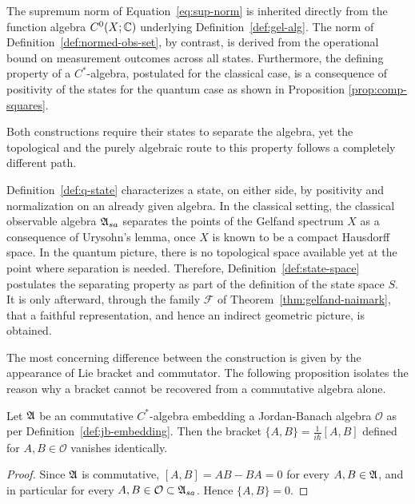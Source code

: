 	\begin{remark}
		\label{rem:concl-norm-comparison}
		The supremum norm of Equation~\eqref{eq:sup-norm} is inherited directly from the function algebra $C^0(X;\mathbb{C})$ underlying Definition~\ref{def:gel-alg}. The norm of Definition~\ref{def:normed-obs-set}, by contrast, is derived from the operational bound on measurement outcomes across all states. Furthermore, the defining property of a $C^*$-algebra, postulated for the classical case, is a consequence of positivity of the states for the quantum case as shown in Proposition \ref{prop:comp-squares}.
	\end{remark}
	
	\noindent Both constructions require their states to separate the algebra, yet the topological and the purely algebraic route to this property follows a completely different path.
	
	\begin{remark}
		\label{rem:concl-states-comparison}
		Definition~\ref{def:q-state} characterizes a state, on either side, by positivity and normalization on an already given algebra. In the classical setting, the classical observable algebra $\mathfrak{A}_{sa}$ separates the points of the Gelfand spectrum $X$ as a consequence of Urysohn's lemma, once $X$ is known to be a compact Hausdorff space. In the quantum picture, there is no topological space available yet at the point where separation is needed. Therefore, Definition~\ref{def:state-space} postulates the separating property as part of the definition of the state space $S$. It is only afterward, through the family $\mathcal F$ of Theorem~\ref{thm:gelfand-naimark}, that a faithful representation, and hence an indirect geometric picture, is obtained.
	\end{remark}
	
	\noindent The most concerning difference between the construction is given by the appearance of Lie bracket and commutator. The following proposition isolates the reason why a bracket cannot be recovered from a commutative algebra alone.
	
	\begin{proposition}
		\label{prop:concl-bracket-vanishes}
		Let $\mathfrak{A}$ be an commutative $C^*$-algebra embedding a Jordan-Banach algebra $\mathcal{O}$ as per Definition~\ref{def:jb-embedding}. Then the bracket $\{A,B\}=\frac{1}{i\hbar}[A,B]$ defined for $A,B\in\mathcal{O}$ vanishes identically.
	\end{proposition}
	\begin{proof}
		Since $\mathfrak{A}$ is commutative, $[A,B]=AB-BA=0$ for every $A,B\in\mathfrak{A}$, and in particular for every $A,B\in\mathcal{O}\subset\A_{sa}$. Hence $\{A,B\}=0$.
	\end{proof}
	
